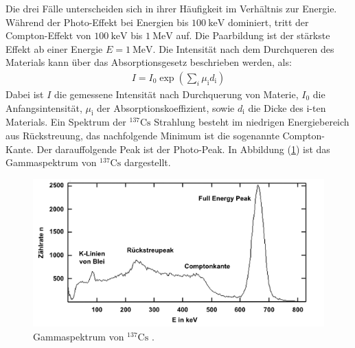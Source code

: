 \FloatBarrier
\noindent Die drei Fälle unterscheiden sich in ihrer Häufigkeit im Verhältnis zur Energie.
Während der Photo-Effekt bei Energien bis $\SI{100}{\kilo\electronvolt}$ dominiert, tritt der Compton-Effekt von $\SI{100}{\kilo\electronvolt}$ bis $\SI{1}{\mega\electronvolt}$ auf. Die Paarbildung ist der stärkste Effekt ab einer Energie $E=\SI{1}{\mega\electronvolt}$.
Die Intensität nach dem Durchqueren des Materials kann über das Absorptionsgesetz beschrieben werden, als:
\begin{align}
  \label{eqn:Ab}
  I=I_\mathrm{0} \exp\left(\sum_i \mu_\mathrm{i} d_\mathrm{i}\right)
\end{align}
Dabei ist $I$ die gemessene Intensität nach Durchquerung von Materie, $I_\mathrm{0}$ die Anfangsintensität, $\mu_\mathrm{i}$ der Absorptionskoeffizient, sowie $d_\mathrm{i}$ die Dicke des i-ten Materials.
Ein Spektrum der ${}^{137}\mathrm{Cs}$ Strahlung besteht im niedrigen Energiebereich aus Rückstreuung, das nachfolgende Minimum ist die sogenannte Compton-Kante. Der darauffolgende Peak ist der Photo-Peak. In Abbildung (\ref{fig:spekt}) ist das Gammaspektrum von ${}^{137}\mathrm{Cs}$ dargestellt.
\begin{figure}
	\centering
	\includegraphics[scale=0.7]{fig/spek_cs.png}
	\caption{Gammaspektrum von ${}^{137}\mathrm{Cs}$ \cite{leifi}.}
	\label{fig:spekt}
\end{figure}
\FloatBarrier
